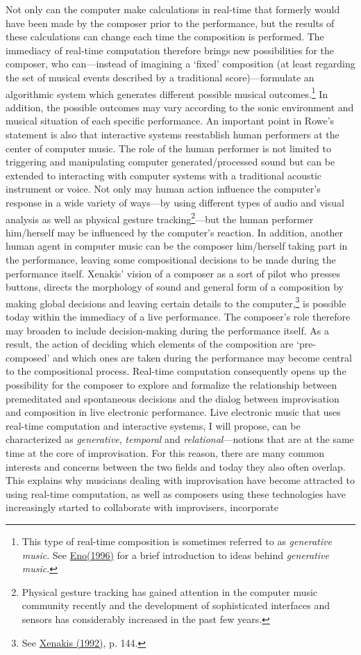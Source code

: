 Not only can the computer make calculations in real-time that formerly would have been made by the composer prior to the performance, but the results of these calculations can change each time the composition is performed. The immediacy of real-time computation therefore brings new possibilities for the composer, who can---instead of imagining a `fixed' composition (at least regarding the set of musical events described by a traditional score)---formulate an algorithmic system which generates different possible musical outcomes.\footnote{This type of real-time composition is sometimes referred to as \emph{generative music}. See \hyperlink{eno}{Eno(1996)} for a brief introduction to ideas behind \emph{generative music}.} In addition, the possible outcomes may vary according to the sonic environment and musical situation of each specific performance. An important point in Rowe's statement is also that interactive systems reestablish human performers at the center of computer music. The role of the human performer is not limited to triggering and manipulating computer generated/processed sound but can be extended to interacting with computer systems with a traditional acoustic instrument or voice. Not only may human action influence the computer's response in a wide variety of ways---by using different types of audio and visual analysis as well as physical gesture tracking\footnote{Physical gesture tracking has gained attention in the computer music community recently and the development of sophisticated interfaces and sensors has considerably increased in the past few years.}---but the human performer him/herself may be influenced by the computer's reaction. In addition, another human agent in computer music can be the composer him/herself taking part in the performance, leaving some compositional decisions to be made during the performance itself. Xenakis' vision of a composer as a sort of pilot who presses buttons, directs the morphology of sound and general form of a composition by making global decisions and leaving certain details to the computer,\footnote{See \hyperlink{xenakis}{Xenakis (1992)}, p. 144.} is possible today within the immediacy of a live performance. The composer's role therefore may broaden to include decision-making during the performance itself. As a result, the action of deciding which elements of the composition are `pre-composed' and which ones are taken during the performance may become central to the compositional process. Real-time computation consequently opens up the possibility for the composer to explore and formalize the relationship between premeditated and spontaneous decisions and the dialog between improvisation and composition in live electronic performance. Live electronic music that uses real-time computation and interactive systems, I will propose, can be characterized as \emph{generative}, \emph{temporal} and \emph{relational}---notions that are at the same time at the core of improvisation. For this reason, there are many common interests and concerns between the two fields and today they also often overlap. This explains why musicians dealing with improvisation have become attracted to using real-time computation, as well as composers using these technologies have increasingly started to collaborate with improvisers, incorporate 